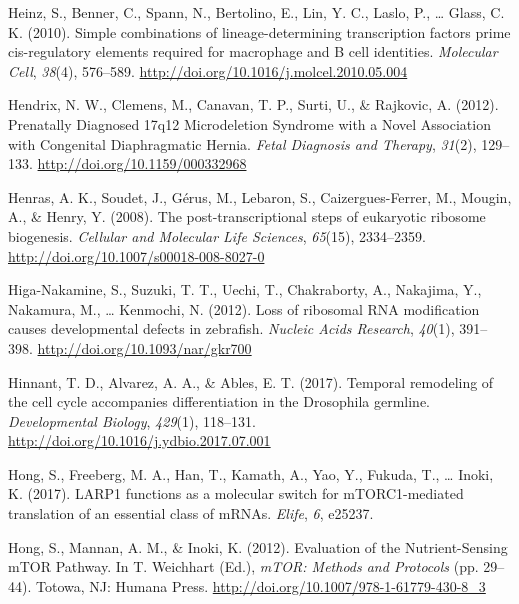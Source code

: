 \documentclass[12pt,oneside]{reedthesis}
\newlength{\cslhangindent}
\newenvironment{cslreferences}%
  {\setlength{\parindent}{0pt}%
  \everypar{\setlength{\hangindent}{\cslhangindent}}\ignorespaces}%
  {\par}
\begin{document}
\begin{cslreferences}
\leavevmode\hypertarget{ref-heinzSimpleCombinationsLineagedetermining2010}{}%
Heinz, S., Benner, C., Spann, N., Bertolino, E., Lin, Y. C., Laslo, P., \ldots{} Glass, C. K. (2010). Simple combinations of lineage-determining transcription factors prime cis-regulatory elements required for macrophage and B cell identities. \emph{Molecular Cell}, \emph{38}(4), 576--589. \url{http://doi.org/10.1016/j.molcel.2010.05.004}

\leavevmode\hypertarget{ref-hendrixPrenatallyDiagnosed17q122012}{}%
Hendrix, N. W., Clemens, M., Canavan, T. P., Surti, U., \& Rajkovic, A. (2012). Prenatally Diagnosed 17q12 Microdeletion Syndrome with a Novel Association with Congenital Diaphragmatic Hernia. \emph{Fetal Diagnosis and Therapy}, \emph{31}(2), 129--133. \url{http://doi.org/10.1159/000332968}

\leavevmode\hypertarget{ref-Henras2008c}{}%
Henras, A. K., Soudet, J., Gérus, M., Lebaron, S., Caizergues-Ferrer, M., Mougin, A., \& Henry, Y. (2008). The post-transcriptional steps of eukaryotic ribosome biogenesis. \emph{Cellular and Molecular Life Sciences}, \emph{65}(15), 2334--2359. \url{http://doi.org/10.1007/s00018-008-8027-0}

\leavevmode\hypertarget{ref-Higa-Nakamine2012o}{}%
Higa-Nakamine, S., Suzuki, T. T., Uechi, T., Chakraborty, A., Nakajima, Y., Nakamura, M., \ldots{} Kenmochi, N. (2012). Loss of ribosomal RNA modification causes developmental defects in zebrafish. \emph{Nucleic Acids Research}, \emph{40}(1), 391--398. \url{http://doi.org/10.1093/nar/gkr700}

\leavevmode\hypertarget{ref-hinnantTemporalRemodelingCell2017}{}%
Hinnant, T. D., Alvarez, A. A., \& Ables, E. T. (2017). Temporal remodeling of the cell cycle accompanies differentiation in the Drosophila germline. \emph{Developmental Biology}, \emph{429}(1), 118--131. \url{http://doi.org/10.1016/j.ydbio.2017.07.001}

\leavevmode\hypertarget{ref-Hong2017a}{}%
Hong, S., Freeberg, M. A., Han, T., Kamath, A., Yao, Y., Fukuda, T., \ldots{} Inoki, K. (2017). LARP1 functions as a molecular switch for mTORC1-mediated translation of an essential class of mRNAs. \emph{Elife}, \emph{6}, e25237.

\leavevmode\hypertarget{ref-hongEvaluationNutrientSensingMTOR2012}{}%
Hong, S., Mannan, A. M., \& Inoki, K. (2012). Evaluation of the Nutrient-Sensing mTOR Pathway. In T. Weichhart (Ed.), \emph{mTOR: Methods and Protocols} (pp. 29--44). Totowa, NJ: Humana Press. \url{http://doi.org/10.1007/978-1-61779-430-8_3}


\end{cslreferences}
\end{document}
